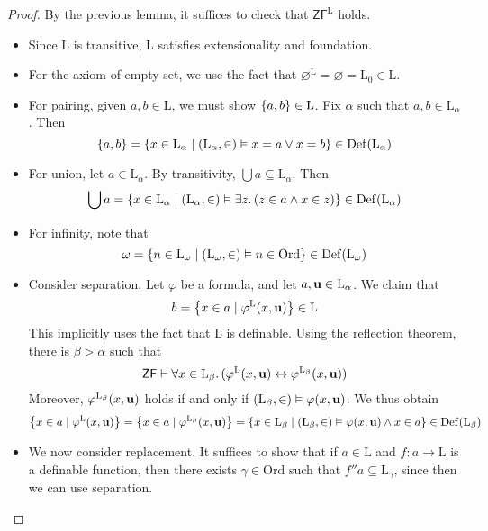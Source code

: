 \begin{proof}
    By the previous lemma, it suffices to check that \( \mathsf{ZF}^{\mathrm{L}} \) holds.
    \begin{itemize}
        \item Since \( \mathrm{L} \) is transitive, \( \mathrm{L} \) satisfies extensionality and foundation.
        \item For the axiom of empty set, we use the fact that \( \varnothing^{\mathrm{L}} = \varnothing = \mathrm{L}_0 \in \mathrm{L} \).
        \item For pairing, given \( a, b \in \mathrm{L} \), we must show \( \qty{a, b} \in \mathrm{L} \).
        Fix \( \alpha \) such that \( a, b \in \mathrm{L}_\alpha \).
        Then
        \[ \qty{a, b} = \qty{x \in \mathrm{L}_\alpha \mid (\mathrm{L}_\alpha, \in) \vDash x = a \vee x = b} \in \operatorname{Def}(\mathrm{L}_\alpha) \]
        \item For union, let \( a \in \mathrm{L}_\alpha \).
        By transitivity, \( \bigcup a \subseteq \mathrm{L}_\alpha \).
        Then
        \[ \bigcup a = \qty{x \in \mathrm{L}_\alpha \mid (\mathrm{L}_\alpha, \in) \vDash \exists z.\, (z \in a \wedge x \in z)} \in \operatorname{Def}(\mathrm{L}_\alpha) \]
        \item For infinity, note that
        \[ \omega = \qty{n \in \mathrm{L}_\omega \mid (\mathrm{L}_\omega, \in) \vDash n \in \mathrm{Ord}} \in \operatorname{Def}(\mathrm{L}_\omega) \]
        \item Consider separation.
        Let \( \varphi \) be a formula, and let \( a, \vb u \in \mathrm{L}_\alpha \).
        We claim that
        \[ b = \qty{x \in a \mid \varphi^{\mathrm{L}}(x, \vb u)} \in \mathrm{L} \]
        This implicitly uses the fact that \( \mathrm{L} \) is definable.
        Using the reflection theorem, there is \( \beta > \alpha \) such that
        \[ \mathsf{ZF} \vdash \forall x \in \mathrm{L}_\beta.\, (\varphi^{\mathrm{L}}(x, \vb u) \leftrightarrow \varphi^{\mathrm{L}_\beta}(x, \vb u)) \]
        Moreover, \( \varphi^{\mathrm{L}_\beta}(x, \vb u) \) holds if and only if \( (\mathrm{L}_\beta, \in) \vDash \varphi(x, \vb u) \).
        We thus obtain
        \[ \qty{x \in a \mid \varphi^{\mathrm{L}}(x, \vb u)} = \qty{x \in a \mid \varphi^{\mathrm{L}_\beta}(x, \vb u)} = \qty{x \in \mathrm{L}_\beta \mid (\mathrm{L}_\beta, \in) \vDash \varphi(x, \vb u) \wedge x \in a} \in \operatorname{Def}(\mathrm{L}_\beta) \]
        \item We now consider replacement.
        It suffices to show that if \( a \in \mathrm{L} \) and \( f : a \to \mathrm{L} \) is a definable function, then there exists \( \gamma \in \mathrm{Ord} \) such that \( f '' a \subseteq \mathrm{L}_\gamma \), since then we can use separation.

\end{itemize}
\end{proof}
